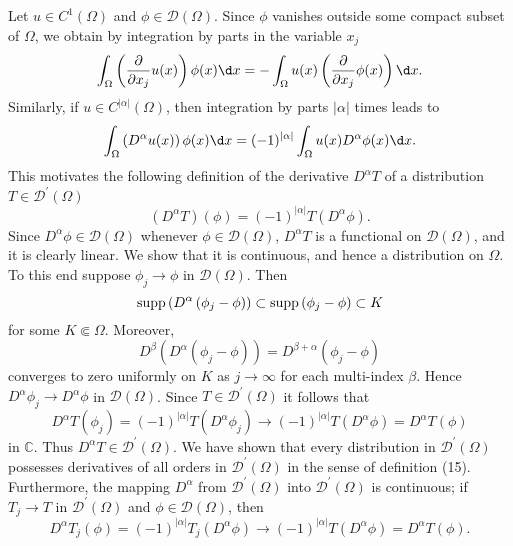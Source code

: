 \begin{para}

  Let $u \in C^1(\Omega)$ and $\phi \in \mathscr{D}(\Omega)$. Since $\phi$ vanishes outside some compact subset of $\Omega$, we obtain by integration by parts in the variable $x_j$
  \[
  \int_{\Omega}\left(\frac{\partial}{\partial x_j} u(x)\right) \phi(x) \d x
    = -\int_{\Omega} u(x)\left(\frac{\partial}{\partial x_j} \phi(x)\right) \d x.
  \]
  Similarly, if $u \in C^{|\alpha|}(\Omega)$, then integration by parts $|\alpha|$ times leads to
  \[
  \int_{\Omega}\left(D^\alpha u(x)\right) \phi(x) \d x
    =(-1)^{|\alpha|} \int_{\Omega} u(x) D^\alpha \phi(x) \d x.
  \]
  This motivates the following definition of the derivative $D^\alpha T$
  of a distribution $T \in \mathscr{D}^{\prime}(\Omega)$
  \[
  \left(D^\alpha T\right)(\phi)=(-1)^{|\alpha|} T\left(D^\alpha \phi\right) .
  \]
  Since $D^\alpha \phi \in \mathscr{D}(\Omega)$ whenever $\phi \in \mathscr{D}(\Omega)$,
  $D^\alpha T$ is a functional on $\mathscr{D}(\Omega)$, and it is clearly linear.
  We show that it is continuous, and hence a distribution on $\Omega$.
  To this end suppose $\phi_j \rightarrow \phi$ in $\mathscr{D}(\Omega)$. Then
  \[
    \operatorname{supp}\left(D^\alpha\left(\phi_j-\phi\right)\right) \subset \operatorname{supp}\left(\phi_j-\phi\right) \subset K
  \]
  for some $K \Subset \Omega$. Moreover,
  \[
  D^\beta\left(D^\alpha\left(\phi_j-\phi\right)\right)=D^{\beta+\alpha}\left(\phi_j-\phi\right)
  \]
  converges to zero uniformly on $K$ as $j \rightarrow \infty$ for each multi-index $\beta$.
  Hence $D^\alpha \phi_j \rightarrow D^\alpha \phi$ in $\mathscr{D}(\Omega)$.
  Since $T \in \mathscr{D}^{\prime}(\Omega)$ it follows that
  \[
  D^\alpha T\left(\phi_j\right)=(-1)^{|\alpha|} T\left(D^\alpha \phi_j\right) \rightarrow(-1)^{|\alpha|} T\left(D^\alpha \phi\right)=D^\alpha T(\phi)
  \]
  in $\mathbb{C}$. Thus $D^\alpha T \in \mathscr{D}^{\prime}(\Omega)$.
  We have shown that every distribution in $\mathscr{D}^{\prime}(\Omega)$ possesses derivatives
  of all orders in $\mathscr{D}^{\prime}(\Omega)$ in the sense of definition (15).
  Furthermore, the mapping $D^\alpha$ from $\mathscr{D}^{\prime}(\Omega)$
  into $\mathscr{D}^{\prime}(\Omega)$ is continuous;
  if $T_j \rightarrow T$ in $\mathscr{D}^{\prime}(\Omega)$ and $\phi \in \mathscr{D}(\Omega)$,
  then
  \[
  D^\alpha T_j(\phi)=(-1)^{|\alpha|} T_j\left(D^\alpha \phi\right) \rightarrow(-1)^{|\alpha|} T\left(D^\alpha \phi\right)=D^\alpha T(\phi) .
  \]
\end{para}

